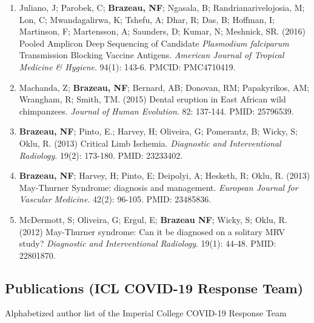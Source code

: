 \documentclass[11pt,letterpaper]{article}
\begin{document}
\begin{enumerate}[leftmargin=*, itemsep=4pt, parsep=0pt]
\item Juliano, J; Parobek, C; \textbf{Brazeau, NF}; Ngasala, B; Randrianarivelojosia, M; Lon, C; Mwandagalirwa, K; Tshefu, A; Dhar, R; Das, B; Hoffman, I; Martinson, F; Martensson, A; Saunders, D; Kumar, N; Meshnick, SR. (2016) Pooled Amplicon Deep Sequencing of Candidate \textit{Plasmodium falciparum} Transmission Blocking Vaccine Antigens. \textit{American Journal of Tropical Medicine \& Hygiene}. 94(1): 143-6. PMCID: PMC4710419.

\item Machanda, Z; \textbf{Brazeau, NF}; Bernard, AB; Donovan, RM; Papakyrikos, AM; Wrangham, R; Smith, TM. (2015) Dental eruption in East African wild chimpanzees. \textit{Journal of Human Evolution}. 82: 137-144. PMID: 25796539.

\item \textbf{Brazeau, NF}; Pinto, E.; Harvey, H; Oliveira, G; Pomerantz, B; Wicky, S; Oklu, R. (2013) Critical Limb Ischemia. \textit{Diagnostic and Interventional Radiology}. 19(2): 173-180. PMID: 23233402.

\item \textbf{Brazeau, NF}; Harvey, H; Pinto, E; Deipolyi, A; Hesketh, R; Oklu, R. (2013) May-Thurner Syndrome: diagnosis and management. \textit{European Journal for Vascular Medicine}. 42(2): 96-105. PMID: 23485836.

\item McDermott, S; Oliveira, G; Ergul, E; \textbf{Brazeau NF}; Wicky, S; Oklu, R. (2012) May-Thurner syndrome: Can it be diagnosed on a solitary MRV study? \textit{Diagnostic and Interventional Radiology}. 19(1): 44-48. PMID: 22801870.

\end{enumerate}

\vspace{6pt}

\subsection{Publications (ICL COVID-19 Response Team)}
\vspace{4pt}

Alphabetized author list of the Imperial College COVID-19 Response Team
\end{document}
